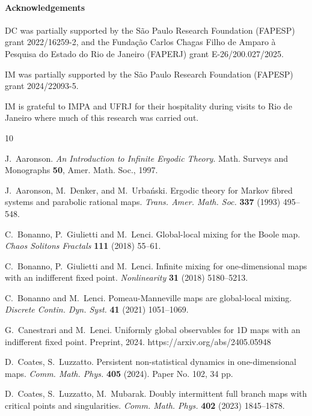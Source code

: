 \documentclass[12pt]{article}
\numberwithin{equation}{section}
\begin{document}
 \paragraph{Acknowledgements}
DC was partially supported by the São Paulo Research Foundation (FAPESP) grant 2022/16259-2, and the Fundação Carlos Chagas Filho de Amparo à Pesquisa do Estado do Rio de Janeiro (FAPERJ) grant E-26/200.027/2025.

IM was partially supported by the São Paulo Research Foundation (FAPESP) grant 
2024/22093-5.


IM is grateful to IMPA and UFRJ for their hospitality during visits to Rio de Janeiro where much of this research was carried out.


\begin{thebibliography}{10}

J.~Aaronson. \emph{{An Introduction to Infinite Ergodic Theory}}. Math. Surveys
  and Monographs \textbf{50}, Amer. Math. Soc., 1997.

J.~Aaronson, M.~Denker, and M.~Urba{\'n}ski. Ergodic theory for {M}arkov fibred
  systems and parabolic rational maps. \emph{Trans. Amer. Math. Soc.}
  \textbf{337} (1993) 495--548.

C.~Bonanno, P.~Giulietti and M.~Lenci. Global-local mixing for the {B}oole
  map. \emph{Chaos Solitons Fractals} \textbf{111} (2018) 55--61.

C.~Bonanno, P.~Giulietti and M.~Lenci. Infinite mixing for one-dimensional
  maps with an indifferent fixed point. \emph{Nonlinearity} \textbf{31} (2018)
  5180--5213.

C.~Bonanno and M.~Lenci. Pomeau-{M}anneville maps are global-local mixing.
  \emph{Discrete Contin. Dyn. Syst.} \textbf{41} (2021) 1051--1069.

G.~Canestrari and M.~Lenci. Uniformly global observables for 1D maps with an
  indifferent fixed point. Preprint, 2024.  https://arxiv.org/abs/2405.05948

D.~Coates, S.~Luzzatto. Persistent non-statistical dynamics in one-dimensional maps. 
	\emph{Comm. Math. Phys.} \textbf{405} (2024).
Paper No. 102, 34 pp.

D.~Coates, S.~Luzzatto, M.~Mubarak. Doubly intermittent full branch maps with critical points and singularities.
	\emph{Comm. Math. Phys.} \textbf{402} (2023) 1845--1878.


\end{thebibliography}
\end{document}
